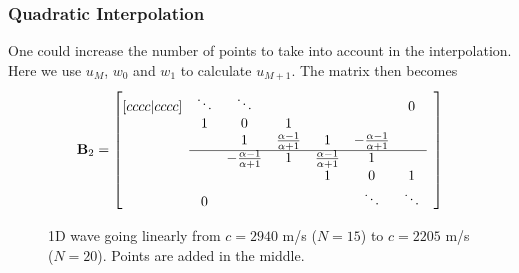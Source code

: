 \documentclass[dvipsnames]{article}
\begin{document}
\subsubsection{Quadratic Interpolation}
One could increase the number of points to take into account in the interpolation. Here we use $u_{M}$, $w_0$ and $w_1$ to calculate $u_{M+1}$. The matrix then becomes
\begin{equation}
    \mathbf{B}_2 = \begin{bmatrix}[cccc|cccc]
     & \ddots  &\ddots & & & & 0 & \\
       & 1 & 0 & 1 & & & & \\
      & & 1 & \frac{\alpha - 1}{\alpha + 1} & 1 & -\frac{\alpha - 1}{\alpha + 1} & \\ \cline{2-7}
      & & -\frac{\alpha - 1}{\alpha + 1} & 1 & \frac{\alpha - 1}{\alpha + 1} & 1 & & \\
         & & & &1 & 0 & 1  \\
         & 0 & &  &  &\ddots & \ddots &
    \end{bmatrix}
\end{equation}
\begin{figure}[h]
    \centering
    \hspace{0.05\textwidth}
    \caption{1D wave going linearly from $c = 2940$ m/s ($N=15$) to $c =2205$ m/s ($N=20$). Points are added in the middle.}\label{fig:linAddInCenter}
\end{figure}
\end{document}
